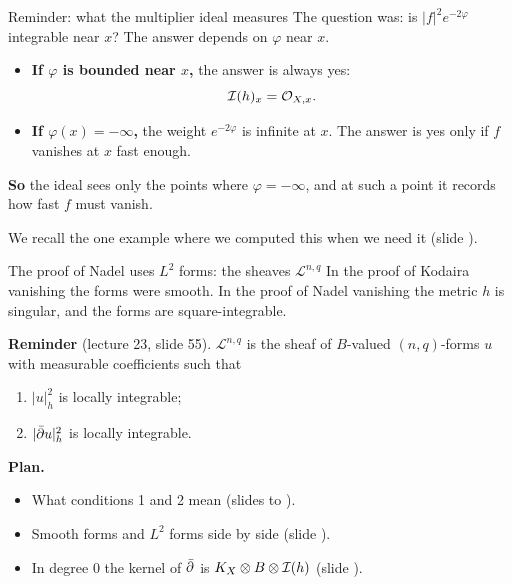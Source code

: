 \begin{frame}{Reminder: what the multiplier ideal measures}
\label{fr:mi-measures}
The question was: is \(|f|^2e^{-2\varphi}\) integrable near \(x\)? The answer depends on \(\varphi\) near \(x\).
\par\bigskip
\begin{itemize}
\setlength{\itemsep}{12pt}
\item \textbf{If \(\varphi\) is bounded near \(x\),} the answer is always yes:
\[
\mathcal I(h)_x=\mathcal O_{X,x}.
\]
\item \textbf{If \(\varphi(x)=-\infty\),} the weight \(e^{-2\varphi}\) is infinite at \(x\). The answer is yes only if \(f\) vanishes at \(x\) fast enough.
\end{itemize}
\par\bigskip
\textbf{So} the ideal sees only the points where \(\varphi=-\infty\), and at such a point it records how fast \(f\) must vanish.
\par\bigskip
We recall the one example where we computed this when we need it (slide \hyperlink{fr:mi-logpole}{\pageref{fr:mi-logpole}}).
\end{frame}

\begin{frame}{The proof of Nadel uses \(L^2\) forms: the sheaves \(\mathcal L^{n,q}\)}
\label{fr:l2-def}
In the proof of Kodaira vanishing the forms were smooth. In the proof of Nadel vanishing the metric \(h\) is singular, and the forms are square-integrable.
\par\medskip
\textbf{Reminder} (lecture 23, slide 55). \(\mathcal L^{n,q}\) is the sheaf of \(B\)-valued \((n,q)\)-forms \(u\) with measurable coefficients such that
\begin{enumerate}
\item \(|u|_h^2\) is locally integrable;
\item \(|\bar\partial u|_h^2\) is locally integrable.
\end{enumerate}
\par\medskip
\textbf{Plan.}
\begin{itemize}
\item What conditions 1 and 2 mean (slides \hyperlink{fr:l2-first}{\pageref{fr:l2-first}} to \hyperlink{fr:l2-second-gives}{\pageref{fr:l2-second-gives}}).
\item Smooth forms and \(L^2\) forms side by side (slide \hyperlink{fr:smooth-vs-l2}{\pageref{fr:smooth-vs-l2}}).
\item In degree \(0\) the kernel of \(\bar\partial\) is \(K_X\otimes B\otimes\mathcal I(h)\) (slide \hyperlink{fr:l2-kernel}{\pageref{fr:l2-kernel}}).
\end{itemize}
\end{frame}

